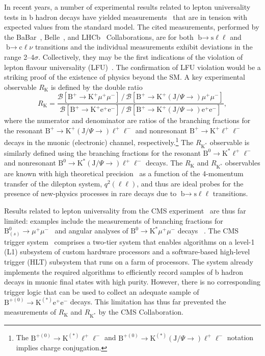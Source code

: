\documentclass{webofc}
\newcommand{\kjpsi}{\ensuremath{(\textrm{J}/\Psi{\rightarrow})}\xspace}
\newcommand{\ellell}{\ensuremath{\ell^+\ell^-}\xspace}
\newcommand{\ee}{\ensuremath{\textrm{e}^+\textrm{e}^-}\xspace}
\newcommand{\mumu}{\ensuremath{\mu^+\mu^-}\xspace}
\newcommand{\bto}{\ensuremath{\textrm{b}{\rightarrow}}\xspace}
\newcommand{\btok}{\ensuremath{\textrm{B}^+{\rightarrow}\textrm{K}^+}\xspace}
\newcommand{\btokst}{\ensuremath{\textrm{B}^0{\rightarrow}\textrm{K}^*}\xspace}
\newcommand{\btokstar}{\ensuremath{\textrm{B}^{+(0)}{\rightarrow}\textrm{K}^{(*)}}\xspace}
\newcommand{\btokll}{\ensuremath{\btok\ellell}\xspace}
\newcommand{\btokmm}{\ensuremath{\btok\mumu}\xspace}
\newcommand{\btokee}{\ensuremath{\btok\ee}\xspace}
\newcommand{\btokjpsill}{\ensuremath{\btok\kjpsi\ellell}\xspace}
\newcommand{\btokjpsimm}{\ensuremath{\btok\kjpsi\mumu}\xspace}
\newcommand{\btokjpsiee}{\ensuremath{\btok\kjpsi\ee}\xspace}
\newcommand{\rk}{\ensuremath{R_{\textrm{K}}}\xspace}
\newcommand{\btokstll}{\ensuremath{\btokst\ellell}\xspace}
\newcommand{\btokstmm}{\ensuremath{\btokst\mumu}\xspace}
\newcommand{\btokstjpsill}{\ensuremath{\btokst\kjpsi\ellell}\xspace}
\newcommand{\rkst}{\ensuremath{R_{\textrm{K}^*}}\xspace}
\newcommand{\btokstarll}{\ensuremath{\btokstar\ellell}\xspace}
\newcommand{\btokstaree}{\ensuremath{\btokstar\ee}\xspace}
\newcommand{\btokstarjpsill}{\ensuremath{\btokstar\kjpsi\ellell}\xspace}
\newcommand{\bsll}{\ensuremath{\bto\textrm{s}\ell\ell}\xspace}
\newcommand{\bclnu}{\ensuremath{\bto\textrm{c}\ell\nu}\xspace}
\newcommand{\bstomm}{\ensuremath{\textrm{B}^0_{(s)}{\rightarrow}\mumu}\xspace}
\begin{document}
In recent years, a number of experimental results related to lepton
universality tests in b hadron decays have yielded
measurements~\cite{} that are in tension with expected values from the
standard model. The cited measurements, performed by the
BaBar~\cite{babar}, Belle~\cite{belle}, and LHCb~\cite{lhcb}
Collaborations, are for both \bsll and \bclnu transitions and the
individual measurements exhibit deviations in the range 2--4$\sigma$.
Collectively, they may be the first indications of the violation of
lepton flavour universality (LFU)~\cite{hflav-rdrdst,
  altmannshofer}. The confirmation of LFU violation would be a
striking proof of the existence of physics beyond the SM. A key
experimental observable \rk is defined by the double ratio %
\begin{equation}
  \rk =
  \frac{\mathcal{B}[\btokmm]\,/\,\mathcal{B}[\btokjpsimm]}{\mathcal{B}[\btokee]\,/\,\mathcal{B}[\btokjpsiee]}, 
  \label{equ:1}
\end{equation}
where the numerator and denominator are ratios of the branching
fractions for the resonant \btokjpsill and nonresonant \btokll decays
in the muonic (electronic) channel, respectively.\footnote{The
  \btokstarll and \btokstarjpsill notation implies charge
  conjugation.} The \rkst observable is similarly defined using the
branching fractions for the resonant \btokstll and nonresonant
\btokstjpsill decays. The \rk and \rkst observables are known with
high theoretical precision~\cite{} as a function of the 4-momentum
transfer of the dilepton system, $q^2(\ell\ell)$, and thus are ideal
probes for the presence of new-physics processes in rare decays due to
\bsll transitions.

Results related to lepton universality from the CMS
experiment~\cite{cms-expt} are thus far limited: examples include the
measurements of branching fractions for \bstomm~\cite{bsmumu} and
angular analyses of \btokstmm decays ~\cite{p5prime-cms}. The CMS
trigger system~\cite{cms-trigger} comprises a two-tier system that
enables algorithms on a level-1 (L1) subsystem of custom hardware
processors and a software-based high-level trigger (HLT) subsystem
that runs on a farm of processors. The system already implements the
required algorithms to efficiently record samples of b hadron decays
in muonic final states with high purity. However, there is no
corresponding trigger logic that can be used to collect an adequate
sample of \btokstaree decays. This limitation has thus far prevented
the measurements of \rk and \rkst by the CMS Collaboration.
\end{document}
